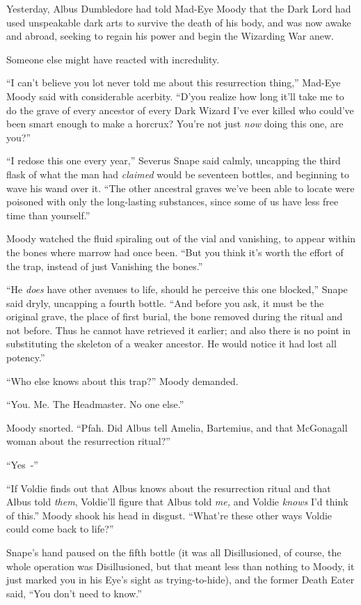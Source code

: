 Yesterday, Albus Dumbledore had told Mad-Eye Moody that the Dark Lord had used unspeakable dark arts to survive the death of his body, and was now awake and abroad, seeking to regain his power and begin the Wizarding War anew.

Someone else might have reacted with incredulity.

``I can't believe you lot never told me about this resurrection thing,'' Mad-Eye Moody said with considerable acerbity. ``D'you realize how long it'll take me to do the grave of every ancestor of every Dark Wizard I've ever killed who could've been smart enough to make a horcrux? You're not just \emph{now} doing this one, are you?''

``I redose this one every year,'' Severus Snape said calmly, uncapping the third flask of what the man had \emph{claimed} would be seventeen bottles, and beginning to wave his wand over it. ``The other ancestral graves we've been able to locate were poisoned with only the long-lasting substances, since some of us have less free time than yourself.''

Moody watched the fluid spiraling out of the vial and vanishing, to appear within the bones where marrow had once been. ``But you think it's worth the effort of the trap, instead of just Vanishing the bones.''

``He \emph{does} have other avenues to life, should he perceive this one blocked,'' Snape said dryly, uncapping a fourth bottle. ``And before you ask, it must be the original grave, the place of first burial, the bone removed during the ritual and not before. Thus he cannot have retrieved it earlier; and also there is no point in substituting the skeleton of a weaker ancestor. He would notice it had lost all potency.''

``Who else knows about this trap?'' Moody demanded.

``You. Me. The Headmaster. No one else.''

Moody snorted. ``Pfah. Did Albus tell Amelia, Bartemius, and that McGonagall woman about the resurrection ritual?''

``Yes~-''

``If Voldie finds out that Albus knows about the resurrection ritual and that Albus told \emph{them}, Voldie'll figure that Albus told \emph{me,} and Voldie \emph{knows} I'd think of this.'' Moody shook his head in disgust. ``What're these other ways Voldie could come back to life?''

Snape's hand paused on the fifth bottle (it was all Disillusioned, of course, the whole operation was Disillusioned, but that meant less than nothing to Moody, it just marked you in his Eye's sight as trying-to-hide), and the former Death Eater said, ``You don't need to know.''

